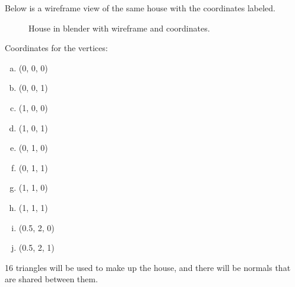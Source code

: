 \documentclass[10pt]{report}
\begin{document}
Below is a wireframe view of the same house with the coordinates labeled.
\begin{figure}[H]
    \centering
    \caption{House in blender with wireframe and coordinates.}
\end{figure}

Coordinates for the vertices:
\begin{enumerate}[(a)]
    \item (0, 0, 0)
    \item (0, 0, 1)
    \item (1, 0, 0)
    \item (1, 0, 1)
    \item (0, 1, 0)
    \item (0, 1, 1)
    \item (1, 1, 0)
    \item (1, 1, 1)
    \item (0.5, 2, 0)
    \item (0.5, 2, 1)
\end{enumerate}

16 triangles will be used to make up the house, and there will be normals that are shared between them.







\end{document}
